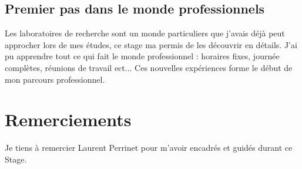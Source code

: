 \documentclass[11pt,francais]{article}
\begin{document}
\subsection{Premier pas dans le monde professionnels}
Les laboratoires de recherche sont un monde particuliers que j'avais déjà peut approcher lors de mes études, ce stage ma permis de les découvrir en détails. J'ai pu apprendre tout ce qui fait le monde professionnel : horaires fixes, journée complètes, réunions de travail ect...
Ces nouvelles expériences forme le début de mon parcours professionnel.

\newpage


\section*{Remerciements}
Je tiens à remercier Laurent Perrinet pour m'avoir encadrés et guidés durant ce Stage.



\newpage
\end{document}
